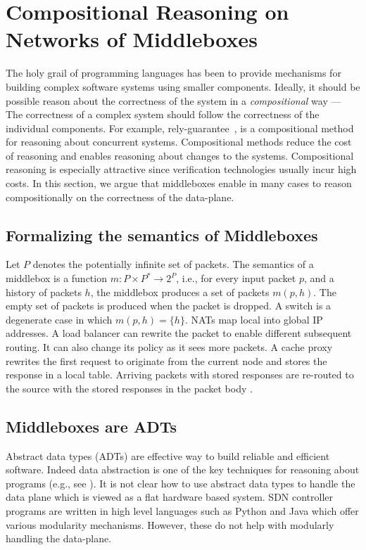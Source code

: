 \newcommand{\lsyn}{\lbrack\!\lbrack}
\newcommand{\rsyn}{\rbrack\!\rbrack}
\newcommand{\semp}[1]{\lsyn #1 \rsyn}
\section{Compositional Reasoning on Networks of Middleboxes}
The holy grail of programming languages has been to provide mechanisms for building complex software systems using smaller components.
Ideally, it should be possible reason about the correctness of the system in a \emph{compositional} way --- The correctness of a
complex system should follow the correctness of the individual components.
For example, rely-guarantee~\cite{tse:MisraC81,ifip:Jones83}, is a compositional method for reasoning about concurrent systems.
Compositional methods reduce the cost of reasoning and enables reasoning about changes to the systems.
Compositional reasoning is especially attractive since verification technologies usually incur high costs.
In this section, we argue that middleboxes enable in many cases to reason compositionally on the correctness of the data-plane.

\subsection{Formalizing the semantics of Middleboxes}
Let $P$ denotes the potentially infinite set of packets.
The semantics of a middlebox is a function  $m\colon P \times P^* \to 2^P$, i.e., for every input packet $p$, and a history of packets $h$, the middlebox
produces a set of packets $m(p, h)$.
The empty set of packets is produced when the packet is dropped.
A switch is a degenerate case in which $m(p, h) = \{h\}$.
NATs map local into global IP addresses.
A load balancer can rewrite the packet to enable different subsequent routing.
It can also change its policy as it sees more packets.
A cache proxy rewrites the first request to originate from the current node
and stores the response in a local table.
Arriving packets with stored responses are re-routed to the source with the stored responses in the packet body .


\subsection{Middleboxes are ADTs}
Abstract data types (ADTs) are effective way to build reliable and efficient software.
Indeed data abstraction is one of the key techniques for reasoning about programs (e.g., see \cite{acta-inf:H72}).
It is not clear how to use abstract data types to handle the data plane which is viewed as a flat hardware
based system.
SDN controller programs are written in high level languages such as Python and Java which offer various modularity mechanisms.
However, these do not help with modularly handling the data-plane.

